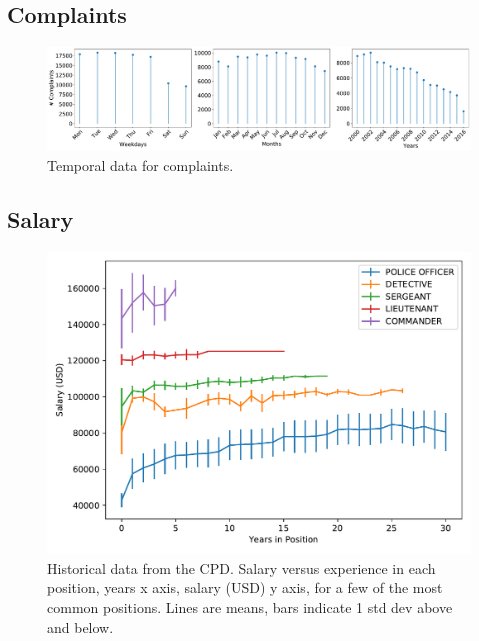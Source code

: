 \subsection{Complaints}

\begin{figure}[h] 
	\includegraphics[width=\textwidth]{figs/complaints_times} 
	\caption{Temporal data for complaints.} \label{fig:complaints}
\end{figure}
\subsection{Salary}

\begin{figure}[h] 
\includegraphics[width=\textwidth]{figs/salary} 
\caption{Historical data from the CPD. Salary versus experience in each
position, years x axis, salary (USD) y axis, for a few of the most common
positions. Lines are means, bars indicate 1 std dev above and below.} \label{fig:salary}
\end{figure}


